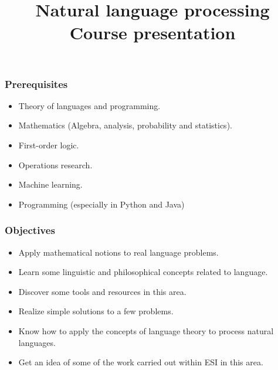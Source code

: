 \documentclass{beamer}
\title[NLP: Presentation] %
{Natural language processing\\Course presentation}
\begin{document}
 

\begin{frame}
\frametitle{Prerequisites}

\begin{itemize}
	\item Theory of languages and programming.
	\item Mathematics (Algebra, analysis, probability and statistics).
	\item First-order logic.
	\item Operations research.
	\item Machine learning.
	\item Programming (especially in Python and Java)
\end{itemize}

\end{frame}


\begin{frame}
\frametitle{Objectives}

\begin{itemize}
	\item Apply mathematical notions to real language problems.
	\item Learn some linguistic and philosophical concepts related to language.
	\item Discover some tools and resources in this area.
	\item Realize simple solutions to a few problems.
	\item Know how to apply the concepts of language theory to process natural languages.
	\item Get an idea of some of the work carried out within ESI in this area.
\end{itemize}

\end{frame}
\end{document}
